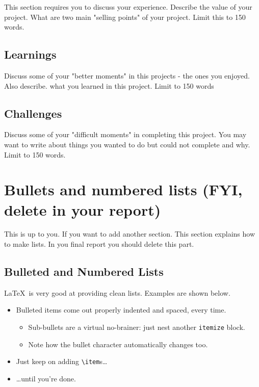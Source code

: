 \documentclass{article}
\begin{document}
This section requires you to discuss your experience. Describe the value of your project. What are two main "selling points" of your project. Limit this to 150 words.

\subsection{Learnings}

Discuss some of your "better moments" in this projects - the ones you enjoyed. Also describe. what you learned in this project. Limit to 150 words

\subsection{Challenges}

Discuss some of your "difficult moments" in completing this project. You may want to write about things you wanted to do but could not complete and why. Limit to 150 words.




\section{Bullets and numbered lists (FYI, delete in your report)}

This is up to you. If you want to add another section. This section explains how to make lists. In you final report you should delete this part. 

\subsection{Bulleted and Numbered Lists}

\LaTeX\ is very good at providing clean lists.  Examples are shown below.

\begin{itemize}
\item Bulleted items come out properly indented and spaced, every time.

\begin{itemize}
\item Sub-bullets are a virtual no-brainer: just nest another \verb!itemize! block.
\item Note how the bullet character automatically changes too.
\end{itemize}

\item Just keep on adding \verb!\item!s\ldots

\item \ldots until you're done.
\end{itemize}
\end{document}
